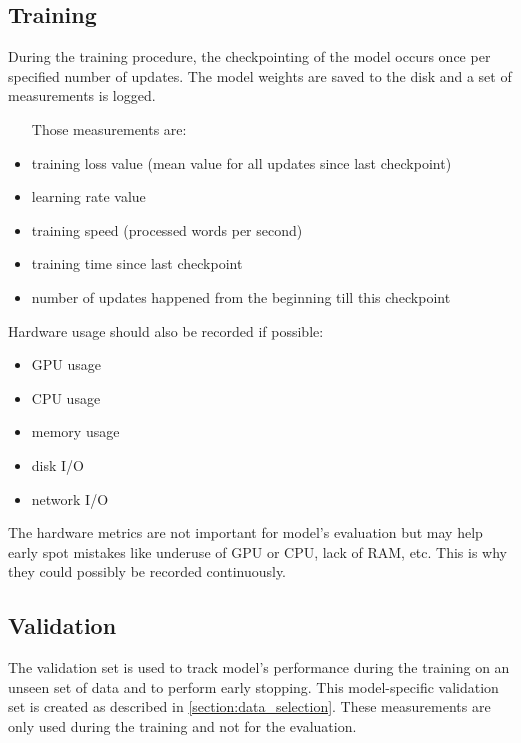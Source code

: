 \subsection{Training}


During the training procedure, the checkpointing of the model occurs once per specified number of updates.
The model weights are saved to the disk and a set of measurements is logged.

\begin{samepage}
\begin{itemize}
	\item [Those measurements are:]
	\item training loss value (mean value for all updates since
	last checkpoint)
	\item learning rate value
	\item training speed (processed words per second)
	\item training time since last checkpoint
	\item number of updates happened from the beginning till this checkpoint
\end{itemize}
\end{samepage}
\begin{samepage}
Hardware usage should also be recorded if possible:
\begin{itemize}
	\item GPU usage
	\item CPU usage
	\item memory usage
	\item disk I/O
	\item network I/O
\end{itemize}
\end{samepage}

The hardware metrics are not important for model's evaluation
but may help early spot mistakes like underuse of GPU or CPU, lack of RAM, etc.
This is why they could possibly be recorded continuously. 

\subsection{Validation}
\label{subsection:validation}

The validation set is used to track model's performance during the training
on an unseen set of data and to perform early stopping.
This model-specific validation set is created as described
in \cref{section:data_selection}.
These measurements are only used during the training and not for the evaluation.

